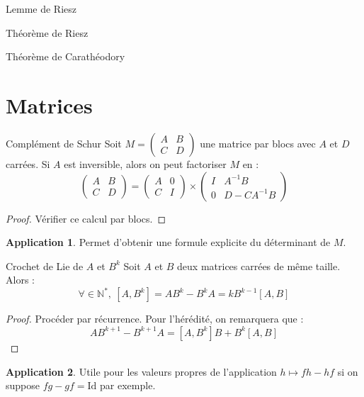 \documentclass[french]{article}
\newcommand{\N}{\mathbb{N}}
\newcommand{\st}{^*}
\newcommand{\inv}{^{-1}}
\theoremstyle{definition}
\newtheorem*{app}{Application}
\begin{document}
\begin{lem}{Lemme de Riesz}
	
\end{lem}

\begin{lem}{Théorème de Riesz}
	
\end{lem}

\begin{lem}{Théorème de Carathéodory}
	
\end{lem}

\section{Matrices}

\begin{lem}{Complément de Schur}
	Soit $M=\displaystyle\begin{pmatrix}
		A&B\\ C&D
	\end{pmatrix}$ une matrice par blocs avec $A$ et $D$ carrées. Si $A$ est inversible, alors on peut factoriser $M$ en : $$\begin{pmatrix}
	A&B\\ C&D
	\end{pmatrix}=\begin{pmatrix}
	A&0\\
	C&I
	\end{pmatrix}\times\begin{pmatrix}
	I&A\inv B\\
	0&D-CA\inv B
	\end{pmatrix}$$
\end{lem}
\begin{proof}
	Vérifier ce calcul par blocs.
\end{proof}
\begin{app}
	Permet d'obtenir une formule explicite du déterminant de $M$.
\end{app}

\begin{lem}{Crochet de Lie de $A$ et $B^k$}
	Soit $A$ et $B$ deux matrices carrées de même taille. Alors : $$\forall \in\N\st,\ [A,B^k]=AB^k-B^kA=kB^{k-1}[A,B]$$
\end{lem}
\begin{proof}
	Procéder par récurrence. Pour l'hérédité, on remarquera que : $$AB^{k+1}-B^{k+1}A=[A,B^k]B+B^k[A,B]$$
\end{proof}
\begin{app}
	Utile pour les valeurs propres de l'application $h\mapsto fh-hf$ si on suppose $fg-gf=\text{Id}$ par exemple. 
\end{app}
\end{document}
